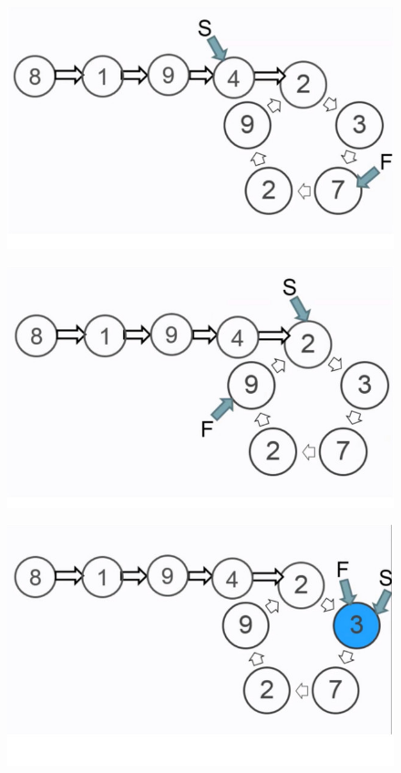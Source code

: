 \documentclass{beamer}
\begin{document}
\begin{frame}
  \begin{figure}
    \includegraphics[scale=0.3]{floyd_step4}
  \end{figure}
\end{frame}
\begin{frame}
  \begin{figure}
    \includegraphics[scale=0.3]{floyd_step5}
  \end{figure}
\end{frame}
\begin{frame}
  \begin{figure}
    \includegraphics[scale=0.3]{floyd_step6}
  \end{figure}
\end{frame}
\end{document}

